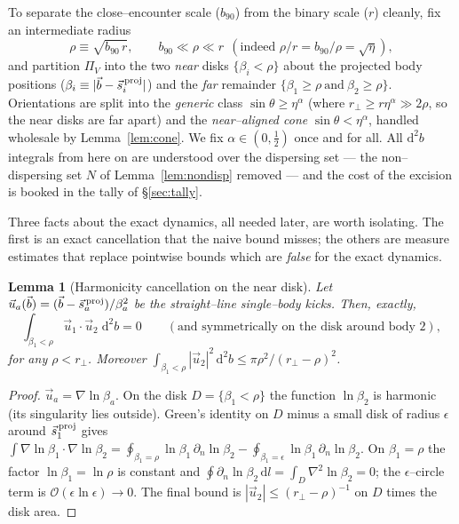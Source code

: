 \documentclass[11pt]{article}
\newcommand{\dd}{\mathrm{d}}
\newcommand{\rp}{r_\perp}
\newcommand{\bv}{\vec b}
\newcommand{\bnt}{b_{90}}
\newcommand{\order}[1]{\mathcal O\!\left(#1\right)}
\newtheorem{lemma}{Lemma}
\begin{document}
To separate the close--encounter scale ($\bnt$) from the binary scale ($r$) cleanly, fix an
intermediate radius
\begin{equation}
  \rho\equiv\sqrt{\bnt\, r},\qquad \bnt\ll\rho\ll r\ \ (\text{indeed }\rho/r=\bnt/\rho=\sqrt\eta),
  \label{eq:rho}
\end{equation}
and partition $\Pi_V$ into the two \emph{near} disks $\{\beta_i<\rho\}$ about the projected body
positions ($\beta_i\equiv|\bv-\vec s_i^{\,\rm proj}|$) and the \emph{far} remainder
$\{\beta_1\ge\rho\ \text{and}\ \beta_2\ge\rho\}$. Orientations are split into the \emph{generic}
class $\sin\theta\ge\eta^\alpha$ (where $\rp\ge r\eta^\alpha\gg2\rho$, so the near disks are far
apart) and the \emph{near--aligned cone} $\sin\theta<\eta^\alpha$, handled wholesale by
Lemma~\ref{lem:cone}. We fix $\alpha\in(0,\tfrac12)$ once and for all. All $\dd^2b$ integrals from
here on are understood over the dispersing set --- the non--dispersing set $N$ of
Lemma~\ref{lem:nondisp} removed --- and the cost of the excision is booked in the tally of
\S\ref{sec:tally}.

Three facts about the exact dynamics, all needed later, are worth isolating. The first is an exact
cancellation that the naive bound misses; the others are measure estimates that replace pointwise
bounds which are \emph{false} for the exact dynamics.

\begin{lemma}[Harmonicity cancellation on the near disk]
\label{lem:harmonic}
Let $\vec u_a(\bv)=(\bv-\vec s_a^{\,\rm proj})/\beta_a^2$ be the straight--line single--body kicks.
Then, exactly,
\begin{equation}
  \int_{\beta_1<\rho}\vec u_1\!\cdot\!\vec u_2\;\dd^2b=0
  \qquad(\text{and symmetrically on the disk around body 2}),
  \label{eq:harmonic}
\end{equation}
for any $\rho<\rp$. Moreover $\int_{\beta_1<\rho}|\vec u_2|^2\,\dd^2b\le\pi\rho^2/(\rp-\rho)^2$.
\end{lemma}

\begin{proof}
$\vec u_a=\nabla\ln\beta_a$. On the disk $D=\{\beta_1<\rho\}$ the function $\ln\beta_2$ is harmonic
(its singularity lies outside). Green's identity on $D$ minus a small disk of radius
$\epsilon$ around $\vec s_1^{\,\rm proj}$ gives
$\int\nabla\ln\beta_1\cdot\nabla\ln\beta_2
=\oint_{\beta_1=\rho}\ln\beta_1\,\partial_n\ln\beta_2
-\oint_{\beta_1=\epsilon}\ln\beta_1\,\partial_n\ln\beta_2$. On $\beta_1=\rho$ the factor
$\ln\beta_1=\ln\rho$ is constant and $\oint\partial_n\ln\beta_2\,\dd l=\int_D\nabla^2\ln\beta_2=0$;
the $\epsilon$--circle term is $\order{\epsilon\ln\epsilon}\to0$. The final bound is
$|\vec u_2|\le(\rp-\rho)^{-1}$ on $D$ times the disk area.
\end{proof}
\end{document}
